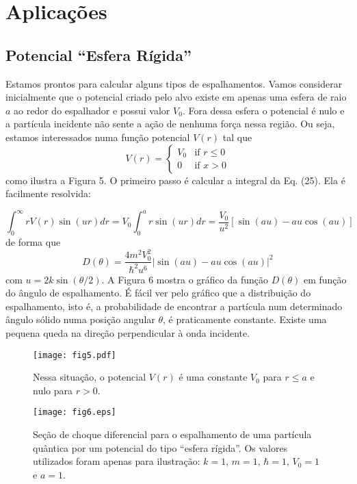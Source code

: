 \documentclass{article}
\begin{document}
\section{Aplicações}

\subsection{Potencial ``Esfera Rígida''}

Estamos prontos para calcular alguns tipos de espalhamentos. Vamos considerar inicialmente que o potencial criado pelo alvo existe em apenas uma esfera de raio $a$ ao redor do espalhador e possui valor $V_0$. Fora dessa esfera o potencial é nulo e a partícula incidente não sente a ação de nenhuma força nessa região. Ou seja, estamos interessados numa função potencial $V(r)$ tal que
\[
 V(r) = 
  \begin{cases} 
   V_0 & \text{if } r \leq 0 \\
   0       & \text{if } x > 0
  \end{cases}
\]
como ilustra a Figura 5. O primeiro passo é calcular a integral da Eq. (25). Ela é facilmente resolvida:

\begin{equation}
\int_{0}^{\infty} r V(r) \sin\left( u r \right) dr=V_0 \int_0^{a}r \sin(ur) dr = \frac{V_0}{u^2} \left[ \sin (au)-au\cos (au) \right]
\end{equation}
de forma que
\begin{equation}
D(\theta) = \frac{4m^2 V_0^2}{\hbar^2 u^6}|\sin(au) - au\cos(au)|^2    
\end{equation}
com $u = 2k\sin(\theta/2)$. A Figura 6 mostra o gráfico da função $D(\theta)$ em função do ângulo de espalhamento. É fácil ver pelo gráfico que a distribuição do espalhamento, isto é, a probabilidade de encontrar a partícula num determinado ângulo sólido numa posição angular $\theta$, é praticamente constante. Existe uma pequena queda na direção perpendicular à onda incidente.

\begin{figure}[h]
\centering
\texttt{[image: fig5.pdf]}
\caption{Nessa situação, o potencial $V(r)$ é uma constante $V_0$ para $r\leq a$ e nulo para $r>0$.}
\end{figure}

\begin{figure}[h]
\centering
\texttt{[image: fig6.eps]}
\caption{Seção de choque diferencial para o espalhamento de uma partícula quântica por um potencial do tipo ``esfera rígida''. Os valores utilizados foram apenas para ilustração: $k = 1$, $m = 1$, $\hbar = 1$, $V_0 = 1$ e $a = 1$.}
\end{figure}
\end{document}
